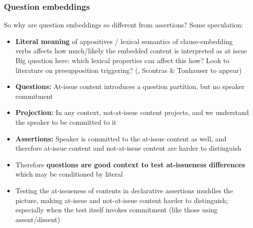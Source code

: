 \documentclass[compress, xcolor = dvipsnames, aspectratio=169, handout]{beamer}
\begin{document}
	\begin{frame}\frametitle{Question embeddings}\small 
		So why are question embeddings so different from assertions? Some speculation:

		\begin{itemize}
			\item \textbf{Literal meaning} of appositives / lexical semantics of clause-embedding verbs affects how much/likely the embedded content is interpreted as at issue\\ 
			{\scriptsize Big question here: which lexical properties can affect this how? Look to literature on presupposition triggering? (\citealt{abrusan_predicting_2011,schlenker_triggering_2021,anand_facts_2024}, Scontras \& Tonhauser to appear)}

			\item \textbf{Questions:} At-issue content introduces a question partition, but no speaker commitment

			\item \textbf{Projection:} In any context, not-at-issue content projects, and we understand the speaker to be committed to it

			\item \textbf{Assertions:} Speaker is committed to the at-issue content as well, and therefore at-issue content and not-at-issue content are harder to distinguish

			\item Therefore \textbf{questions are good context to test at-issueness differences} which may be conditioned by literal

			\item Testing the at-issueness of contents in declarative assertions muddles the picture, making at-issue and not-at-issue content harder to distinguish; especially when the test itself invokes commitment (like those using assent/dissent)

		\end{itemize}
	
	\end{frame}
	
\end{document}
